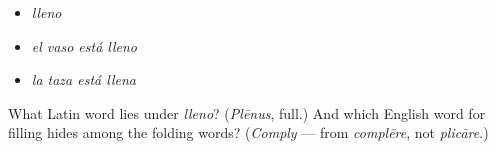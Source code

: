 \begin{itemize}
\raggedright
  \item \emph{lleno}
  \item \emph{el vaso está lleno}
  \item \emph{la taza está llena}
\end{itemize}

\begin{tcolorbox}[breakable,colback=teal!4,colframe=teal!35!black,title={Before you move on}]
What Latin word lies under \emph{lleno}? (\emph{Plēnus}, full.) And which English word for filling hides among the folding words? (\emph{Comply} — from \emph{complēre}, not \emph{plicāre}.)
\end{tcolorbox}
